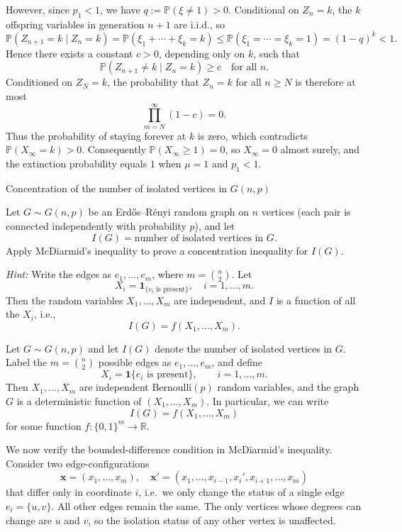 \documentclass[answers,12pt,addpoints]{exam}
\begin{document}
\begin{questions}
\begin{solution}
However, since $p_1<1$, we have $q := \mathbb{P}(\xi \neq 1) > 0$. Conditional on $Z_n = k$, the $k$ offspring variables in generation $n+1$ are i.i.d., so
\[
\mathbb{P}(Z_{n+1} = k \mid Z_n = k)
= \mathbb{P}(\xi_1 + \cdots + \xi_k = k)
\le \mathbb{P}(\xi_1 = \cdots = \xi_k = 1)
= (1-q)^k < 1.
\]
Hence there exists a constant $c>0$, depending only on $k$, such that
\[
\mathbb{P}(Z_{n+1} \neq k \mid Z_n = k) \ge c \quad \text{for all } n.
\]
Conditioned on $Z_N = k$, the probability that $Z_n = k$ for all $n \ge N$ is therefore at most
\[
\prod_{m=N}^{\infty} (1-c) = 0.
\]
Thus the probability of staying forever at $k$ is zero, which contradicts $\mathbb{P}(X_\infty = k)>0$. Consequently $\mathbb{P}(X_\infty \ge 1)=0$, so $X_\infty = 0$ almost surely, and the extinction probability equals $1$ when $\mu = 1$ and $p_1<1$.
\end{solution}

\newpage

\question Concentration of the number of isolated vertices in \(G(n,p)\)

Let \(G \sim G(n,p)\) be an Erd\H{o}s--R\'enyi random graph on \(n\) vertices (each pair is connected independently with probability \(p\)), and let
\[
I(G) = \text{number of isolated vertices in } G.
\]
Apply McDiarmid's inequality to prove a concentration inequality for \(I(G)\).

\medskip

\textit{Hint:} Write the edges as \(e_1,\dots,e_m\), where \(m = \binom{n}{2}\). Let
\[
X_i = \mathbf{1}_{\{e_i \text{ is present}\}}, \quad i = 1,\dots,m.
\]
Then the random variables \(X_1,\dots,X_m\) are independent, and \(I\) is a function of all the \(X_i\), i.e.,
\[
I(G) = f(X_1,\dots,X_m).
\] 

\begin{solution}
Let $G \sim G(n,p)$ and let $I(G)$ denote the number of isolated vertices in $G$.
Label the $m = \binom{n}{2}$ possible edges as $e_1,\dots,e_m$, and define
\[
X_i = \mathbf{1}\{e_i \text{ is present}\}, \qquad i=1,\dots,m.
\]
Then $X_1,\dots,X_m$ are independent Bernoulli$(p)$ random variables, and the graph
$G$ is a deterministic function of $(X_1,\dots,X_m)$. In particular, we can write
\[
I(G) = f(X_1,\dots,X_m)
\]
for some function $f:\{0,1\}^m \to \mathbb{R}$.

\medskip

We now verify the bounded-difference condition in McDiarmid's inequality.
Consider two edge-configurations
\[
\mathbf{x} = (x_1,\dots,x_m), \quad \mathbf{x}' = (x_1,\dots,x_{i-1},x_i',x_{i+1},\dots,x_m)
\]
that differ only in coordinate $i$, i.e.\ we only change the status of a single edge
$e_i = \{u,v\}$. All other edges remain the same. The only vertices whose degrees
can change are $u$ and $v$, so the isolation status of any other vertex is unaffected.


\end{solution}
\end{questions}
\end{document}
